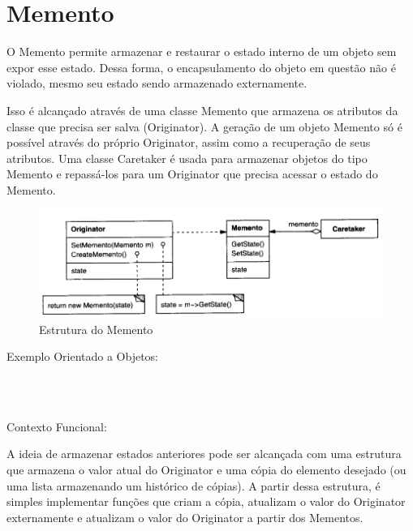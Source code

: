 \section{Memento}

O Memento permite armazenar e restaurar o estado interno de um 
objeto sem expor esse estado. Dessa forma, o encapsulamento do 
objeto em questão não é violado, mesmo seu estado sendo armazenado 
externamente.

Isso é alcançado através de uma classe Memento que armazena os 
atributos da classe que precisa ser salva (Originator). A geração 
de um objeto Memento só é possível através do próprio Originator, 
assim como a recuperação de seus atributos. Uma classe Caretaker 
é usada para armazenar objetos do tipo Memento e repassá-los para 
um Originator que precisa acessar o estado do Memento.

\begin{figure}[htb]
	\caption{\label{memento_struct}Estrutura do Memento}
	\begin{center}
	    \includegraphics[scale=0.5]{5_padroes-contexto-funcional/5.3_comportamentais/5.3.06_memento/diagram.png}
	\end{center}
\end{figure}

Exemplo Orientado a Objetos:

\begin{lstlisting}[caption={Memento Orientação a Objetos},label=oomemento]



\end{lstlisting}

Contexto Funcional:

A ideia de armazenar estados anteriores pode ser alcançada com uma 
estrutura que armazena o valor atual do Originator e uma cópia do 
elemento desejado (ou uma lista armazenando um histórico de cópias). 
A partir dessa estrutura, é simples implementar funções que criam 
a cópia, atualizam o valor do Originator externamente e atualizam 
o valor do Originator a partir dos Mementos.

\begin{lstlisting}[caption={Memento Funcional},label=fpmemento]



\end{lstlisting}